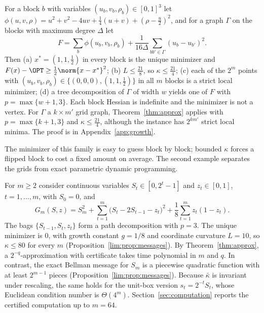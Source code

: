 \begin{example}\label{ex:family}
For a block $b$ with variables $(u_b,v_b,\rho_b)\in[0,1]^3$ let
$\phi(u,v,\rho)=u^2+v^2-4uv+\frac14(u+v)+(\rho-\frac u2)^2$, and for a graph
$\Gamma$ on the blocks with maximum degree $\Delta$ let
\[
F=\sum_b\phi(u_b,v_b,\rho_b)+\frac1{16\Delta}\sum_{bb'\in\Gamma}(u_b-u_{b'})^2 .
\]
Then (a) $x^*=(1,1,\frac12)$ in every block is the unique minimizer and
$F(x)-\OPT\ge\frac12\norm{x-x^*}^2$; (b) $L\le\frac{21}8$, so
$\kappa\le\frac{21}4$; (c) each of the $2^m$ points with
$(u_b,v_b,\rho_b)\in\{(0,0,0),(1,1,\frac12)\}$ in all $m$ blocks is a strict
local minimizer; (d) a tree decomposition of $\Gamma$ of width $w$ yields one of
$F$ with $p=\max\{w+1,3\}$. Each block Hessian is indefinite and the minimizer
is not a vertex. For $\Gamma$ a $k\times m'$ grid graph, Theorem~\ref{thm:approx}
applies with $p=\max\{k+1,3\}$ and $\kappa\le\frac{21}4$, although the instance
has $2^{km'}$ strict local minima. The proof is in Appendix~\ref{app:growth}.
\end{example}

The minimizer of this family is easy to guess block by block; bounded $\kappa$
forces a flipped block to cost a fixed amount on average. The second example
separates the grids from exact parametric dynamic programming.

\begin{example}\label{ex:chain}
For $m\ge2$ consider continuous variables $S_t\in[0,2^t-1]$ and
$z_t\in[0,1]$, $t=1,\dots,m$, with $S_0=0$, and
\[
G_m(S,z)=S_m^2+\sum_{t=1}^m\bigl(S_t-2S_{t-1}-z_t\bigr)^2
+\frac18\sum_{t=1}^mz_t(1-z_t).
\]
The bags $\{S_{t-1},S_t,z_t\}$ form a path decomposition with $p=3$. The unique
minimizer is $0$, with growth constant $g=1/8$ and coordinate curvature $L=10$,
so $\kappa\le80$ for every $m$ (Proposition~\ref{lim:prop:messages}). By
Theorem~\ref{thm:approx}, a $2^{-q}$-approximation with certificate takes time
polynomial in $m$ and $q$. In contrast, the exact Bellman message for $S_m$ is a
piecewise quadratic function with at least $2^{m-1}$ pieces
(Proposition~\ref{lim:prop:messages}). Because $\bar\kappa$ is invariant under
rescaling, the same holds for the unit-box version $s_t=2^{-t}S_t$, whose
Euclidean condition number is $\Theta(4^m)$. Section~\ref{sec:computation}
reports the certified computation up to $m=64$.
\end{example}
